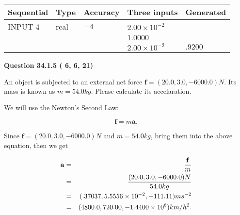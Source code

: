 \documentclass[12pt]{article}
\begin{document}
   
  
  
\noindent\begin{tabular}{|l|l|l|l|l|}
\hline
 Sequential & Type & Accuracy & Three inputs & Generated \\ 
\hline
 
 
  INPUT $           4$ & real & $          -4 $ & $
 2.00 \times 10^{-2}
  $ & \\
  & & &  $
 1.0000
  $ & \\
  & & &  $
 2.00 \times 10^{-2}
 $ & $ .9200 $ 
 \\  \hline  
 \end{tabular}
   
   
  
\vspace{0.2in}
  
{\textbf{\Large{Question
34.1.5 
 (          6,          6,         21)
}}}
  
  
 
An object is subjected to an external net force $\mathbf{f}=(
20.0,  %
3.0,
-6000.0  )N$. Its mass is known as
$m= %
54.0 kg$. Please calculate its accelaration.
 
 
 
 
\noindent{}
 
 

We will use the Newton's Second Law:
 
\[
\mathbf{f}=m\mathbf{a}.
\]
 
Since $\mathbf{f}=( %
20.0,  %
3.0,  %
-6000.0 )N$
and $m= %
54.0 kg$, bring them into the above equation, then we get
 
\begin{eqnarray*}
\mathbf{a}&=&\frac{\mathbf{f}}m  \\
&=&\frac{(
20.0 ,
3.0 ,
-6000.0 )N
}{ %
54.0 kg}  \\
&=&(
.37037 ,
5.5556 \times 10^{-2},
-111.11
)ms^{-2} \\
&=&(
4800.0 ,
720.00 ,
-1.4400 \times 10^{6}
)km/h^2.
\end{eqnarray*}
 
 
 
\noindent{}
 
 

 
 
 
\noindent{}
 
\end{document}
